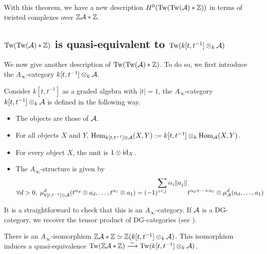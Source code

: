\documentclass[12pt]{article}
\begin{document}
	With this theorem, we have a new description $H^0(\textup{Tw}(\textup{Tw}({\cal{A}})*\mathbb{Z}))$ in terms of twisted complexes over $\mathbb{Z} {\cal{A}} * \mathbb{Z}$. 
	
	\subsection{$\textup{Tw}(\textup{Tw}({\cal{A}}) * \mathbb{Z})$ is quasi-equivalent to $\textup{Tw}(k[t,t^{-1}] \otimes_k {\cal{A}})$}
	
	We now give another description of $\textup{Tw}(\textup{Tw}({\cal{A}}) * \mathbb{Z})$. To do so, we first introduce the $A_\infty$-category $k[t,t^{-1}] \otimes_k {\cal{A}}$.
	
	\begin{definition}
		Consider $k[t,t^{-1}]$ as a graded algebra with $|t|=1$, the $A_\infty$-category $k[t,t^{-1}] \otimes_k {\cal{A}}$ is defined in the following way.
		\begin{itemize}
			\item The objects are those of ${\cal{A}}$.
			\item For all objects $X$ and $Y$, $\textup{Hom}_{k[t,t^{-1}]\otimes {\cal{A}}}(X,Y):= k[t,t^{-1}] \otimes_k \textup{Hom}_{\cal{A}}(X,Y)$.
			\item For every object $X$, the unit is $1 \otimes \textup{id}_X$.
			\item The $A_\infty$-structure is given by
			\[\forall d>0, \; \mu^d_{k[t,t^{-1}] \otimes {\cal{A}}}(t^{\alpha_d} \otimes a_d, \dots, t^{\alpha_1}\otimes a_1) = (-1)^{\displaystyle\sum_{i<j} \alpha_i \|a_j\|} t^{\alpha_d + \dots + \alpha_1} \otimes \mu_{\cal{A}}^d(a_d,\dots,a_1)\]
		\end{itemize}
	\end{definition}
	
	\begin{remark}
		It is a straightforward to check that this is an $A_\infty$-category. If ${\cal{A}}$ is a DG-category, we recover the tensor product of DG-categories (see \cite[Section 6.1]{KelDG}).
	\end{remark}
	
	\begin{proposition}
		\label{equitwo}
		There is an $A_\infty$-isomorphism $\mathbb{Z} {\cal{A}} * \mathbb{Z} \simeq \mathbb{Z}(k[t,t^{-1}] \otimes_k {\cal{A}})$. This isomorphism induces a quasi-equivalence $\textup{Tw}(\mathbb{Z} {\cal{A}} * \mathbb{Z}) \overset{\sim}{\longrightarrow} \textup{Tw}(k[t,t^{-1}] \otimes_k {\cal{A}})$.
	\end{proposition}
	
\end{document}
